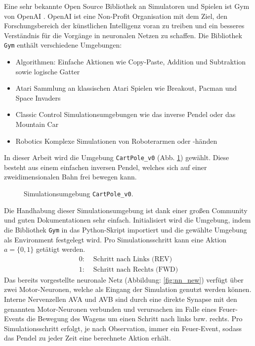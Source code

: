 	Eine sehr bekannte Open Source Bibliothek an Simulatoren und Spielen ist Gym von OpenAI \cite{Brockman2016}. OpenAI ist eine Non-Profit Organisation mit dem Ziel, den Forschungsbereich der künstlichen Intelligenz voran zu treiben und ein besseres Verständnis für die Vorgänge in neuronalen Netzen zu schaffen. Die Bibliothek \texttt{Gym} enthält verschiedene Umgebungen:
	\begin{itemize}
		\item Algorithmen:
		\subitem Einfache Aktionen wie Copy-Paste, Addition und Subtraktion sowie logische Gatter
		\item Atari
		\subitem Sammlung an klassischen Atari Spielen wie Breakout, Pacman und Space Invaders
		\item Classic Control
		\subitem Simulationsumgebungen wie das inverse Pendel oder das Mountain Car
		\item Robotics
		\subitem Komplexe Simulationen von Roboterarmen oder -händen
	\end{itemize}
	In dieser Arbeit wird die Umgebung \texttt{CartPole\_v0} (Abb. \ref{fig:imp_cartpole}) gewählt. Diese besteht aus einem einfachen inversen Pendel, welches sich auf einer zweidimensionalen Bahn frei bewegen kann.
	\begin{figure}[H]
		\centering
		\def\svgwidth{13cm}
		
		\caption{Simulationsumgebung \texttt{CartPole\_v0}.}
		\label{fig:imp_cartpole}
	\end{figure}
	Die Handhabung dieser Simulationsumgebung ist dank einer großen Community und guten Dokumentationen sehr einfach. Initialisiert wird die Umgebung, indem die Bibliothek \texttt{Gym} in das Python-Skript importiert und die gewählte Umgebung als \glqq Environment\grqq{} festgelegt wird. Pro Simulationsschritt kann eine Aktion $a = \{0,1\}$ getätigt werden.
	\begin{align*}
		0 :& \text{ Schritt nach Links (REV)}\\
		1 :& \text{ Schritt nach Rechts (FWD)}
	\end{align*}
	Das bereits vorgestellte neuronale Netz (Abbildung: \ref{fig:nn_new}) verfügt über zwei Motor-Neuronen, welche als Eingang der Simulation genutzt werden können. Interne Nervenzellen AVA und AVB sind durch eine direkte Synapse mit den genannten Motor-Neuronen verbunden und verursachen im Falle eines Feuer-Events die Bewegung des Wagens um einen Schritt nach links bzw. rechts. Pro Simulationsschritt erfolgt, je nach Observation, immer ein Feuer-Event, sodass das Pendel zu jeder Zeit eine berechnete Aktion erhält.
